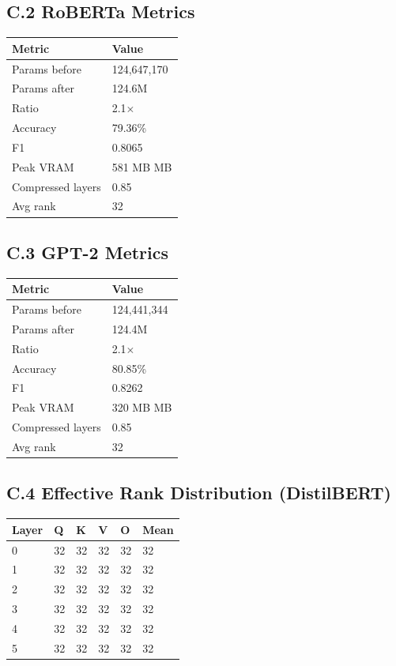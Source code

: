 \subsection{C.2 RoBERTa Metrics}

\begin{table}[H]
\centering
\small
\begin{tabular}{ll}
\toprule
\textbf{Metric} & \textbf{Value} \\
\midrule
Params before & 124,647,170 \\
Params after & 124.6M \\
Ratio & 2.1$\times$ \\
Accuracy & 79.36\% \\
F1 & 0.8065 \\
Peak VRAM & 581 MB MB \\
Compressed layers & 0.85 \\
Avg rank & 32 \\
\bottomrule
\end{tabular}
\end{table}

\subsection{C.3 GPT-2 Metrics}

\begin{table}[H]
\centering
\small
\begin{tabular}{ll}
\toprule
\textbf{Metric} & \textbf{Value} \\
\midrule
Params before & 124,441,344 \\
Params after & 124.4M \\
Ratio & 2.1$\times$ \\
Accuracy & 80.85\% \\
F1 & 0.8262 \\
Peak VRAM & 320 MB MB \\
Compressed layers & 0.85 \\
Avg rank & 32 \\
\bottomrule
\end{tabular}
\end{table}

\subsection{C.4 Effective Rank Distribution (DistilBERT)}

\begin{table}[H]
\centering
\small
\begin{tabular}{llllll}
\toprule
\textbf{Layer} & \textbf{Q} & \textbf{K} & \textbf{V} & \textbf{O} & \textbf{Mean} \\
\midrule
0 & 32 & 32 & 32 & 32 & 32 \\
1 & 32 & 32 & 32 & 32 & 32 \\
2 & 32 & 32 & 32 & 32 & 32 \\
3 & 32 & 32 & 32 & 32 & 32 \\
4 & 32 & 32 & 32 & 32 & 32 \\
5 & 32 & 32 & 32 & 32 & 32 \\
\bottomrule
\end{tabular}
\end{table}

